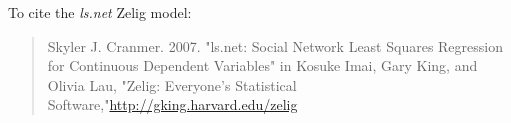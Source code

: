 To cite the \emph{ ls.net } Zelig model:
 \begin{verse}
 Skyler J. Cranmer. 2007. "ls.net: Social Network Least Squares Regression for Continuous Dependent Variables" in Kosuke Imai, Gary King, and Olivia Lau, "Zelig: Everyone's Statistical Software,"\url{http://gking.harvard.edu/zelig} 
\end{verse}